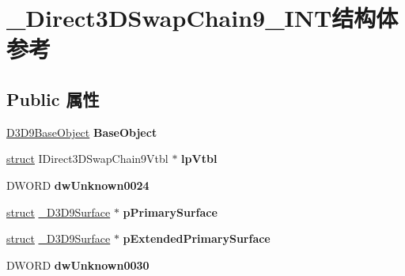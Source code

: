 \hypertarget{struct___direct3_d_swap_chain9___i_n_t}{}\section{\+\_\+\+Direct3\+D\+Swap\+Chain9\+\_\+\+I\+N\+T结构体 参考}
\label{struct___direct3_d_swap_chain9___i_n_t}
\subsection*{Public 属性}
\begin{DoxyCompactItemize}
\item 
\mbox{\label{struct___direct3_d_swap_chain9___i_n_t_af0b46d394b82d9a8f020d543f3d938c4}} 
\hyperlink{struct___d3_d9_base_object}{D3\+D9\+Base\+Object} {\bfseries Base\+Object}
\item 
\mbox{\label{struct___direct3_d_swap_chain9___i_n_t_a453b29ac9023b2aab8719581389ae758}} 
\hyperlink{interfacestruct}{struct} I\+Direct3\+D\+Swap\+Chain9\+Vtbl $\ast$ {\bfseries lp\+Vtbl}
\item 
\mbox{\label{struct___direct3_d_swap_chain9___i_n_t_ae8bc28e362d3ba1b4dc96f2678c616c1}} 
D\+W\+O\+RD {\bfseries dw\+Unknown0024}
\item 
\mbox{\label{struct___direct3_d_swap_chain9___i_n_t_ab813f5630270d9092e1c950c898ea455}} 
\hyperlink{interfacestruct}{struct} \hyperlink{struct___d3_d9_surface}{\+\_\+\+D3\+D9\+Surface} $\ast$ {\bfseries p\+Primary\+Surface}
\item 
\mbox{\label{struct___direct3_d_swap_chain9___i_n_t_a00381a19033ea8b0d7cef683aba2f367}} 
\hyperlink{interfacestruct}{struct} \hyperlink{struct___d3_d9_surface}{\+\_\+\+D3\+D9\+Surface} $\ast$ {\bfseries p\+Extended\+Primary\+Surface}
\item 
\mbox{\label{struct___direct3_d_swap_chain9___i_n_t_a80600831f57274e0bb90f55392aa34a6}} 
D\+W\+O\+RD {\bfseries dw\+Unknown0030}
\item 

\end{DoxyCompactItemize}
